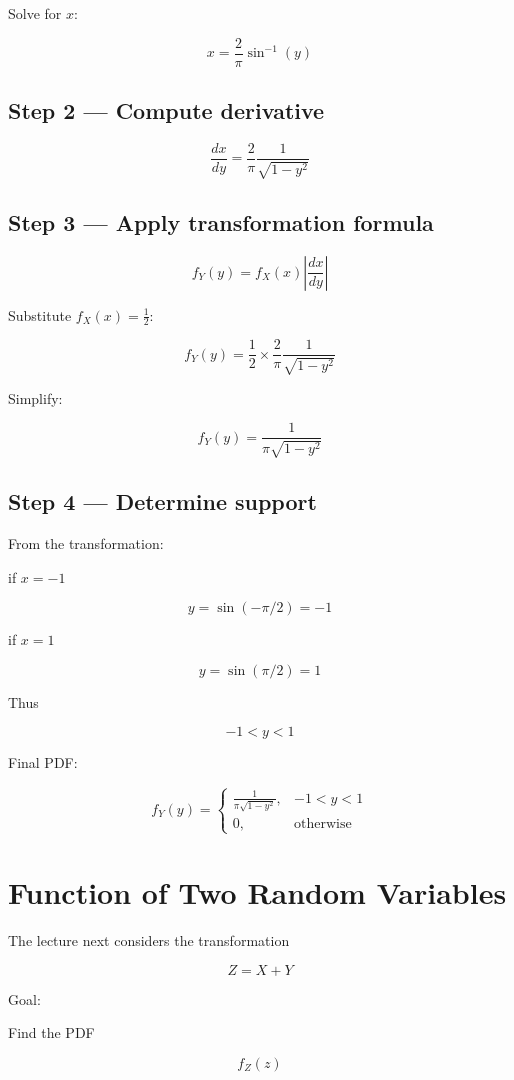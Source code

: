 \documentclass{article}
\begin{document}
Solve for $x$:

\[
x = \frac{2}{\pi}\sin^{-1}(y)
\]

\subsection*{Step 2 — Compute derivative}

\[
\frac{dx}{dy} = \frac{2}{\pi}\frac{1}{\sqrt{1-y^2}}
\]

\subsection*{Step 3 — Apply transformation formula}

\[
f_Y(y) = f_X(x)\left|\frac{dx}{dy}\right|
\]

Substitute $f_X(x) = \frac{1}{2}$:

\[
f_Y(y) = \frac{1}{2}\times \frac{2}{\pi}\frac{1}{\sqrt{1-y^2}}
\]

Simplify:

\[
f_Y(y) = \frac{1}{\pi\sqrt{1-y^2}}
\]

\subsection*{Step 4 — Determine support}

From the transformation:

if $x = -1$

\[
y = \sin(-\pi/2) = -1
\]

if $x = 1$

\[
y = \sin(\pi/2) = 1
\]

Thus

\[
-1 < y < 1
\]

Final PDF:

\[
f_Y(y) =
\begin{cases}
\frac{1}{\pi\sqrt{1-y^2}}, & -1 < y < 1 \\
0, & \text{otherwise}
\end{cases}
\]

\section*{Function of Two Random Variables}

The lecture next considers the transformation

\[
Z = X + Y
\]

Goal:

Find the PDF

\[
f_Z(z)
\]
\end{document}
